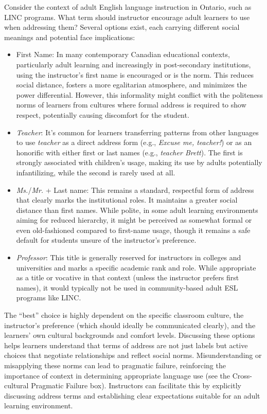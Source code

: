 Consider the context of adult English language instruction in Ontario, such as LINC programs. What term should instructor encourage adult learners to use when addressing them? Several options exist, each carrying different social meanings and potential face implications:

\begin{itemize}[noitemsep]
    \item First Name: In many contemporary Canadian educational contexts, particularly adult learning and increasingly in post-secondary institutions, using the instructor's first name is encouraged or is the norm. This reduces social distance, fosters a more egalitarian atmosphere, and minimizes the power differential. However, this informality might conflict with the politeness norms of learners from cultures where formal address is required to show respect, potentially causing discomfort for the student.
    
    \item \textit{Teacher}: It's common for learners transferring patterns from other languages to use \textit{teacher} as a direct address form (e.g., \textit{Excuse me, teacher!}) or as an honorific with either first or last names (e.g., \textit{teacher Brett}). The first is strongly associated with children's usage, making its use by adults potentially infantilizing, while the second is rarely used at all.

    \item \textit{Ms.}/\textit{Mr.} + Last name: This remains a standard, respectful form of address that clearly marks the institutional roles. It maintains a greater social distance than first names. While polite, in some adult learning environments aiming for reduced hierarchy, it might be perceived as somewhat formal or even old-fashioned compared to first-name usage, though it remains a safe default for students unsure of the instructor's preference.
    
    \item \textit{Professor}: This title is generally reserved for instructors in colleges and universities and marks a specific academic rank and role. While appropriate as a title or vocative in that context (unless the instructor prefers first names), it would typically not be used in community-based adult ESL programs like LINC.
\end{itemize}

The ``best'' choice is highly dependent on the specific classroom culture, the instructor's preference (which should ideally be communicated clearly), and the learners' own cultural backgrounds and comfort levels. Discussing these options helps learners understand that terms of address are not just labels but active choices that negotiate relationships and reflect social norms. Misunderstanding or misapplying these norms can lead to pragmatic failure, reinforcing the importance of context in determining appropriate language use (see the Cross-cultural Pragmatic Failure box). Instructors can facilitate this by explicitly discussing address terms and establishing clear expectations suitable for an adult learning environment.


